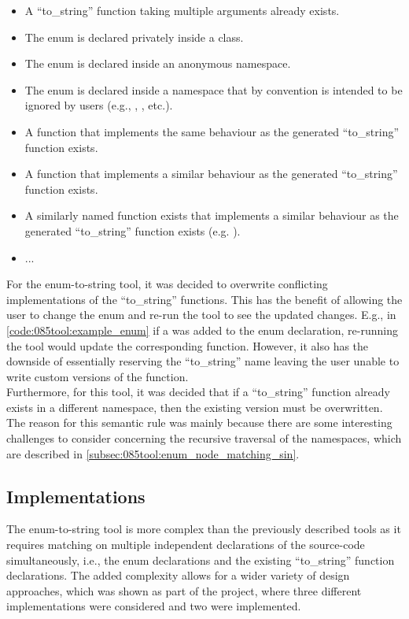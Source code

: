 \begin{itemize}
    \vspace{-0.75em}
    \item A ``to\_string'' function taking multiple arguments already exists.
    \item The enum is declared privately inside a class.
    \item The enum is declared inside an anonymous namespace.
    \item The enum is declared inside a namespace that by convention is intended to be ignored by users (e.g., , , etc.).
    \item A function that implements the same behaviour as the generated ``to\_string'' function exists.
    \item A function that implements a similar behaviour as the generated ``to\_string'' function exists.
    \item A similarly named function exists that implements a similar behaviour as the generated ``to\_string'' function exists (e.g. ).
    \item ...
\end{itemize}

For the enum-to-string tool, it was decided to overwrite conflicting implementations of the ``to\_string'' functions.
This has the benefit of allowing the user to change the enum and re-run the tool to see the updated changes. E.g., in \cref{code:085tool:example_enum} if a  was added to the enum declaration, re-running the tool would update the corresponding  function.
However, it also has the downside of essentially reserving the ``to\_string'' name leaving the user unable to write custom versions of the function.\\
Furthermore, for this tool, it was decided that if a ``to\_string'' function already exists in a different namespace, then the existing version must be overwritten. The reason for this semantic rule was mainly because there are some interesting challenges to consider concerning the recursive traversal of the namespaces, which are described in \cref{subsec:085tool:enum_node_matching_sin}.
\pagebreak
\subsection{Implementations}
The enum-to-string tool is more complex than the previously described tools as it requires matching on multiple independent declarations of the source-code simultaneously, i.e., the enum declarations and the existing ``to\_string'' function declarations. The added complexity allows for a wider variety of design approaches, which was shown as part of the project, where three different implementations were considered and two were implemented.

